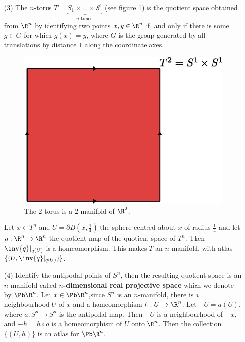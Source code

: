 \begin{example}
\begin{enumerate}
             \item[(3)] The $n$-torus  $T=\underbrace{S_1 \times \dots \times
                 S^1}_{n \text{ times }}$ (see figure \ref{fig_1.2}) is the quotient
                 space obtained from $\R^n$ by identifying two points  $x,y \in \R^n$
                 if, and only if there is some $g \in G$ for which $g(x)=y$,
                 where $G$ is the group generated by all translations by distance
                 $1$ along the coordinate axes.
                 \begin{figure}[h]
                     \centering
                     \includegraphics[scale=0.5]{Figures/chapter1/2_torus.eps}
                     \caption{The $2$-torus is a  $2$ manifold of  $\R^2$.}
                     \label{fig_1.2}
                 \end{figure}
                 Let $x \in T^n$ and  $U=\partial{B(x,\frac{1}{4})}$ the
                 sphere centred about $x$ of radius $\frac{1}{4}$ and let
                 $q:\R^n \xrightarrow{} \R^n$ the quotient map of the quotient
                 space of $T^n$. Then  $\inv{q}|_{q(U)}$ is a homeomorphism.
                 This makes $T$ an  $n$-manifold, with atlas
                 $\{(U,\inv{q}|_{q(U)})\}$.

             \item[(4)] Identify the antipodal points of $S^n$, then the
                 resulting quotient space is an $n$-manifold called
                 \textbf{$n$-dimensional real projective space} which we denote
                 by $\Pb\R^n$. Let $x \in \Pb\R^n$,since $S^n$ is an  $n$-manifold,
                 there is a neighbourhood  $U$ of  $x$ and a homeomorphism $h:U
                 \xrightarrow{} \R^n$. Let $-U=a(U)$, where $a:S^n \xrightarrow{}
                 S^n$ is the antipodal map. Then $-U$ is a neighbourhood of
                 $-x$, and  $-h=h \circ a$ is a homeomorphism of  $U$ onto
                 $\R^n$. Then the collection  $\{(U,h)\}$ is an atlas for
                 $\Pb\R^n$.


\end{enumerate}
\end{example}
